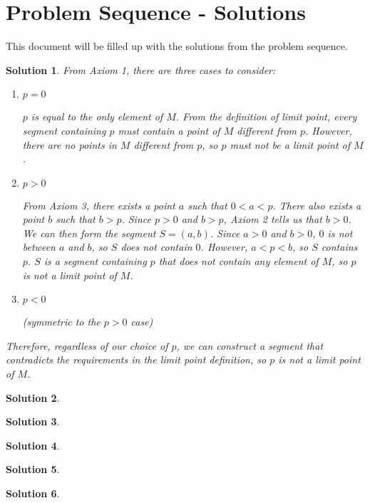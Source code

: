 \documentclass{article}
\newtheorem{solution}{Solution}
\begin{document}
\section*{Problem Sequence - Solutions}
This document will be filled up with the solutions from the problem sequence.

\begin{solution} %
From Axiom 1, there are three cases to consider:
\begin{enumerate}
\item
$p = 0$

$p$ is equal to the only element of $M$. From the definition of limit point, every segment containing $p$ must contain a point of $M$ different from $p$. However, there are no points in $M$ different from $p$, so $p$ must not be a limit point of $M$.

\item
$p > 0$

From Axiom 3, there exists a point $a$ such that $0 < a < p$. There also exists a point $b$ such that $b > p$. Since $p > 0$ and $b > p$, Axiom 2 tells us that $b > 0$. We can then form the segment $S = (a, b)$. Since $a > 0$ and $b > 0$, $0$ is not between $a$ and $b$, so $S$ does not contain $0$. However, $a < p < b$, so $S$ contains $p$. $S$ is a segment containing $p$ that does not contain any element of $M$, so $p$ is not a limit point of $M$.

\item
$p < 0$

(symmetric to the $p > 0$ case)
\end{enumerate}

Therefore, regardless of our choice of $p$, we can construct a segment that contradicts the requirements in the limit point definition, so $p$ is not a limit point of $M$.
\end{solution}

\begin{solution}
\end{solution}

\begin{solution}
\end{solution}

\begin{solution}
\end{solution}

\begin{solution} %
\end{solution}

\begin{solution} %
\end{solution}
\end{document}
